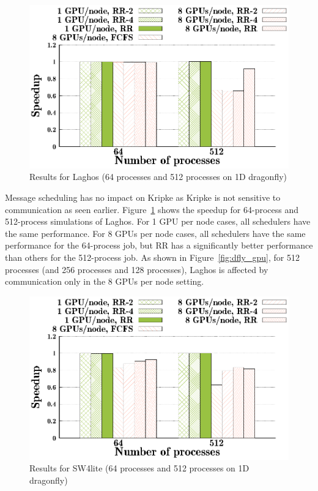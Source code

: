 \begin{figure}[t]
  \centering
  \includegraphics[width=0.8\columnwidth]{figure/plots/sched/dfly-sched-mapping-laghos.eps}
  \vspace{-0.5in}
    \caption{Results for Laghos (64 processes and 512 processes on 1D dragonfly)}
  \label{fig:laghos_scheduling_dfly}
\end{figure}


Message scheduling has no impact on Kripke as Kripke is not sensitive to
communication as seen earlier. Figure~\ref{fig:laghos_scheduling_dfly} shows
the speedup for 64-process and 512-process simulations of Laghos. For 1 GPU per node cases, all
schedulers have the same performance. For 8 GPUs per node cases, all schedulers
have the same performance for the 64-process job, but RR has a significantly
better performance than others for the 512-process job. As shown in
Figure~\ref{fig:dfly_gpu}, for 512 processes (and 256 processes and 128
processes), Laghos is affected by communication only in the 8 GPUs per node
setting.


\begin{figure}[t]
  \centering
  \includegraphics[width=0.8\columnwidth]{figure/plots/sched/dfly-sched-mapping-sw4lite.eps}
  \vspace{-0.5in}
  \caption{Results for SW4lite (64 processes and 512 processes on 1D dragonfly)}
  \label{fig:sw4lite_scheduling_dfly}
\end{figure}


